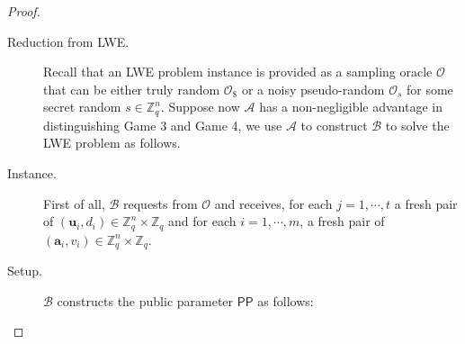\documentclass[runningheads,10pt]{llncs}
\def\ZZ{\mathbb{Z}}
\def\cal{\mathcal}
\def\bf{\mathbf}
\def\PP{\mathsf{PP}}
\begin{document}
\begin{proof}
\begin{description}
		\item[Reduction from LWE.] Recall that an LWE problem instance is provided as a sampling oracle $\cal{O}$ that can be either truly random $\cal{O}_\$$ or a noisy pseudo-random $\cal{O}_s$ for some secret random $s\in\ZZ_q^n$. Suppose now $\cal{A}$ has a non-negligible advantage in distinguishing Game 3 and Game 4, we use $\cal{A}$ to construct $\cal{B}$ to solve the LWE problem as follows.
		
		\item[Instance.] First of all, $\cal{B}$ requests from $\cal{O}$ and receives, for each $j=1,\cdots, t$ a fresh pair of $(\bf{u}_i,d_i)\in\ZZ_q^n\times\ZZ_q$ and for each $i=1,\cdots,m$, a fresh pair of $(\bf{a}_i,v_i)\in\ZZ_q^n\times\ZZ_q$.
		\item[Setup.] $\cal{B}$ constructs the public parameter $\PP$ as follows:
		

\end{description}
\end{proof}
\end{document}
